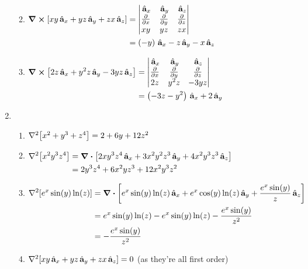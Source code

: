 \documentclass{homework}
\begin{document}
\begin{enumerate}
\begin{enumerate}
		\vspace{1em}
		
			\item $\begin{aligned}[t]
				\curl[xy \thinspace\hat{ \mathbf{a}}_{x} + yz \thinspace\hat{ \mathbf{a}}_{y} + zx \thinspace\hat{ \mathbf{a}}_{z}] & = \abs{
					\begin{matrix}
						\thinspace\hat{ \mathbf{a}}_{x} & \thinspace\hat{ \mathbf{a}}_{y} & \thinspace\hat{ \mathbf{a}}_{z} \\
						\pdv{x} & \pdv{y} & \pdv{z} \\
						xy & yz & zx
					\end{matrix}
				} \\
				& = \left(-y\right) \thinspace\hat{ \mathbf{a}}_{x} -z \thinspace\hat{ \mathbf{a}}_{y} - x\thinspace\hat{ \mathbf{a}}_{z}
			\end{aligned}$
			
		\vspace{1em}
		
			\item $\begin{aligned}[t]
				\curl[2z \thinspace\hat{ \mathbf{a}}_{x} + y^2z \thinspace\hat{ \mathbf{a}}_{y} - 3yz \thinspace\hat{ \mathbf{a}}_{z}] & = \abs{
					\begin{matrix}
						\thinspace\hat{ \mathbf{a}}_{x} & \thinspace\hat{ \mathbf{a}}_{y} & \thinspace\hat{ \mathbf{a}}_{z} \\
						\pdv{x} & \pdv{y} & \pdv{z} \\
						2z & y^2 z & -3yz
					\end{matrix}
				} \\
				& = \left(-3z - y^2\right) \thinspace\hat{ \mathbf{a}}_{x} + 2 \thinspace\hat{ \mathbf{a}}_{y}
			\end{aligned}$
		\end{enumerate}
	
	\vspace{1em}
	
		\item \begin{enumerate}
			\item $\laplacian[x^2 + y^3 + z^4] = 2 + 6y + 12z^2$
			\item $\begin{aligned}[t]
				\laplacian[x^2 y^3 z^4] & = \div[2xy^3 z^4 \uvec{x} + 3x^2y^2z^3 \uvec{y} + 4x^2y^3z^3 \uvec{z}] \\
					& = 2y^3z^4 + 6x^2yz^3 + 12x^2y^3z^2
			\end{aligned}$
			\item $\begin{aligned}[t]
				\laplacian[e^x \sin(y) \ln(z)] & = \div[ e^x \sin(y) \ln(z) \uvec{x} + e^x \cos(y) \ln(z) \uvec{y} + \frac{e^x \sin(y)}{z} \uvec{z}] \\
					& = e^x \sin(y) \ln(z) - e^x \sin(y) \ln(z) - \frac{e^x \sin(y)}{z^2} \\
					& = -\frac{e^x \sin(y)}{z^2}
			\end{aligned}$
			
			\item $\laplacian[xy \uvec{x} + yz \uvec{y} + zx \uvec{z}] = 0$ \qquad (as they're all first order)
		\end{enumerate}
	\end{enumerate}
\end{document}
